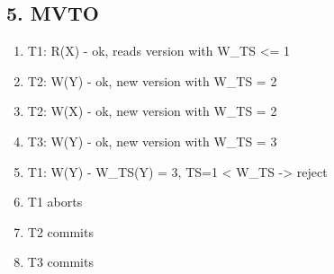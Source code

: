 \documentclass[fleqn]{article}
\begin{document}
  \subsection*{5. MVTO}
  \begin{enumerate}
    \item T1: R(X) - ok, reads version with W_TS <= 1
    \item T2: W(Y) - ok, new version with W_TS = 2
    \item T2: W(X) - ok, new version with W_TS = 2
    \item T3: W(Y) - ok, new version with W_TS = 3
    \item T1: W(Y) - W_TS(Y) = 3, TS=1 < W_TS -> reject
    \item T1 aborts
    \item T2 commits
    \item T3 commits
  \end{enumerate}
\end{document}
